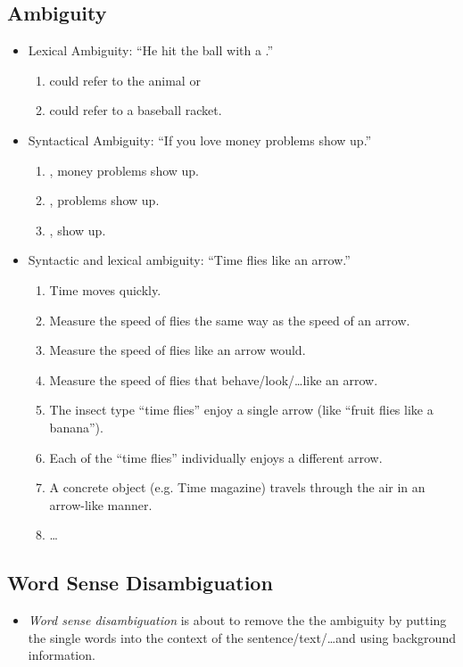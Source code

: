		\subsection{Ambiguity} %
			\begin{itemize}
				\item Lexical Ambiguity: \enquote{He hit the ball with a .}
					\begin{enumerate}
						\item {} could refer to the animal or
						\item {} could refer to a baseball racket.
					\end{enumerate}
				\item Syntactical Ambiguity: \enquote{If you love money problems show up.}
					\begin{enumerate}
						\item {}, money problems show up.
						\item {}, problems show up.
						\item {}, show up.
					\end{enumerate}
				\item Syntactic and lexical ambiguity: \enquote{Time flies like an arrow.}
					\begin{enumerate}
						\item Time moves quickly.
						\item Measure the speed of flies the same way as the speed of an arrow.
						\item Measure the speed of flies like an arrow would.
						\item Measure the speed of flies that behave/look/\dots like an arrow.
						\item The insect type \enquote{time flies} enjoy a single arrow (like \enquote{fruit flies like a banana}).
						\item Each of the \enquote{time flies} individually enjoys a different arrow.
						\item A concrete object (e.g. Time magazine) travels through the air in an arrow-like manner.
						\item \dots
					\end{enumerate}
			\end{itemize}

		\subsection{Word Sense Disambiguation} %
			\begin{itemize}
				\item \textit{Word sense disambiguation} is about to remove the the ambiguity by putting the single words into the context of the sentence/text/\dots and using background information.
			\end{itemize}

